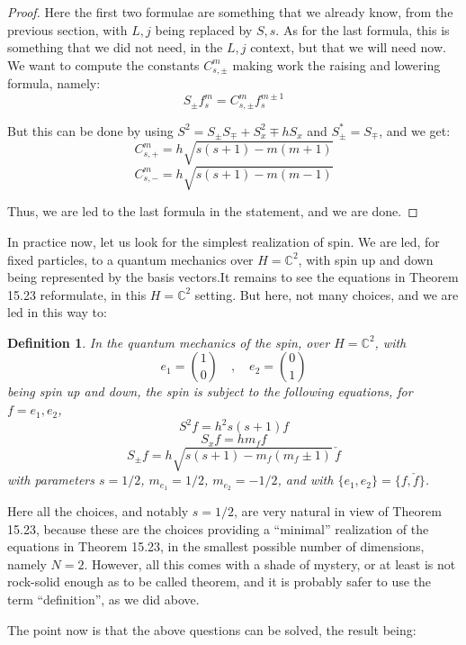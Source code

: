 \documentclass[12pt]{amsbook}
\newtheorem{definition}[theorem]{Definition}
\begin{document}
\begin{proof}
Here the first two formulae are something that we already know, from the previous section, with $L,j$ being replaced by $S,s$. As for the last formula, this is something that we did not need, in the $L,j$ context, but that we will need now. We want to compute the constants $C_{s,\pm}^m$ making work the raising and lowering formula, namely:
$$S_\pm f_s^m=C_{s,\pm}^mf_s^{m\pm1}$$

But this can be done by using $S^2=S_\pm S_\mp+S_x^2\mp hS_x$ and $S_\pm^*=S_\mp$, and we get:
$$C_{s,+}^m=h\sqrt{s(s+1)-m(m+1)}$$
$$C_{s,-}^m=h\sqrt{s(s+1)-m(m-1)}$$

Thus, we are led to the last formula in the statement, and we are done.
\end{proof}

In practice now, let us look for the simplest realization of spin. We are led, for fixed particles, to a quantum mechanics over $H=\mathbb C^2$, with spin up and down being represented by the basis vectors.It remains to see the equations in Theorem 15.23 reformulate, in this $H=\mathbb C^2$ setting. But here, not many choices, and we are led in this way to:

\begin{definition}
In the quantum mechanics of the spin, over $H=\mathbb C^2$, with
$$e_1=\binom{1}{0}\quad,\quad e_2=\binom{0}{1}$$
being spin up and down, the spin is subject to the following equations, for $f=e_1,e_2$, 
$$S^2f=h^2s(s+1)f$$
$$S_xf=hm_ff$$
$$S_\pm f=h\sqrt{s(s+1)-m_f(m_f\pm1)}\,\check{f}$$
with parameters $s=1/2$, $m_{e_1}=1/2$, $m_{e_2}=-1/2$, and with $\{e_1,e_2\}=\{f,\check{f}\}$.
\end{definition}

Here all the choices, and notably $s=1/2$, are very natural in view of Theorem 15.23, because these are the choices providing a ``minimal'' realization of the equations in Theorem 15.23, in the smallest possible number of dimensions, namely $N=2$. However, all this comes with a shade of mystery, or at least is not rock-solid enough as to be called theorem, and it is probably safer to use the term ``definition'', as we did above.

\bigskip

The point now is that the above questions can be solved, the result being:
\end{document}
